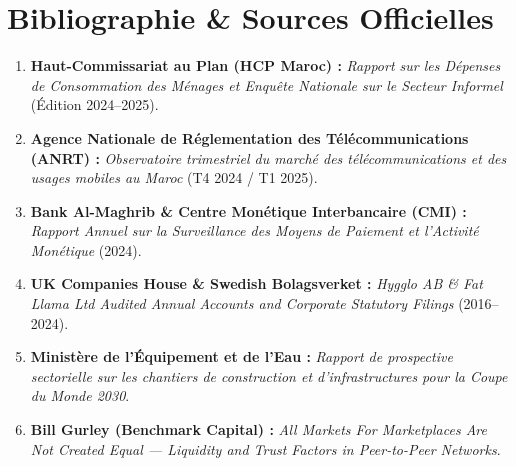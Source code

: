 \documentclass[11pt,a4paper]{report}
\begin{document}
\chapter*{Bibliographie \& Sources Officielles}

\begin{enumerate}[leftmargin=*]
    \item \textbf{Haut-Commissariat au Plan (HCP Maroc) :} \textit{Rapport sur les Dépenses de Consommation des Ménages et Enquête Nationale sur le Secteur Informel} (Édition 2024--2025).
    \item \textbf{Agence Nationale de Réglementation des Télécommunications (ANRT) :} \textit{Observatoire trimestriel du marché des télécommunications et des usages mobiles au Maroc} (T4 2024 / T1 2025).
    \item \textbf{Bank Al-Maghrib \& Centre Monétique Interbancaire (CMI) :} \textit{Rapport Annuel sur la Surveillance des Moyens de Paiement et l'Activité Monétique} (2024).
    \item \textbf{UK Companies House \& Swedish Bolagsverket :} \textit{Hygglo AB \& Fat Llama Ltd Audited Annual Accounts and Corporate Statutory Filings} (2016--2024).
    \item \textbf{Ministère de l'Équipement et de l'Eau :} \textit{Rapport de prospective sectorielle sur les chantiers de construction et d'infrastructures pour la Coupe du Monde 2030}.
    \item \textbf{Bill Gurley (Benchmark Capital) :} \textit{All Markets For Marketplaces Are Not Created Equal --- Liquidity and Trust Factors in Peer-to-Peer Networks}.
\end{enumerate}
\end{document}
